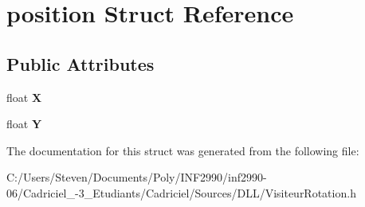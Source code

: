 \hypertarget{structposition}{}\section{position Struct Reference}
\label{structposition}
\subsection*{Public Attributes}
\begin{DoxyCompactItemize}
\item 
\hypertarget{structposition_a216a393164d184a43ac6951f03aa81de}{}\label{structposition_a216a393164d184a43ac6951f03aa81de} 
float {\bfseries X}
\item 
\hypertarget{structposition_a357b87e4e84ff9f209f164cacbf8beae}{}\label{structposition_a357b87e4e84ff9f209f164cacbf8beae} 
float {\bfseries Y}
\end{DoxyCompactItemize}


The documentation for this struct was generated from the following file\+:\begin{DoxyCompactItemize}
\item 
C\+:/\+Users/\+Steven/\+Documents/\+Poly/\+I\+N\+F2990/inf2990-\/06/\+Cadriciel\+\_-\/3\+\_\+\+Etudiants/\+Cadriciel/\+Sources/\+D\+L\+L/Visiteur\+Rotation.\+h\end{DoxyCompactItemize}

